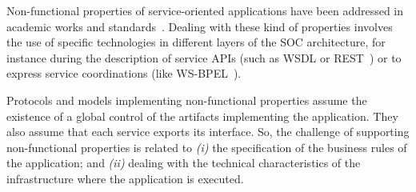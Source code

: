 \bigskip

Non-functional properties of service-oriented applications have been
addressed in academic works and standards~\cite{ws-co,ws-tra,wsci}.
Dealing with these kind of properties involves the use of specific technologies
in different layers of the SOC architecture, for instance during the description
of service APIs (such as WSDL\cite{wsdl} or REST~\cite{rest}) or to express
service coordinations (like WS-BPEL~\cite{bpel03}).


Protocols and models implementing non-functional properties assume the existence of a global control of the artifacts implementing the application.
They also assume that each service exports its interface.
So, the challenge of supporting non-functional properties is related to
\textit{(i)} the specification of the business rules of the application; and 
\textit{(ii)} dealing with the technical characteristics of the infrastructure where the application is executed.

%


